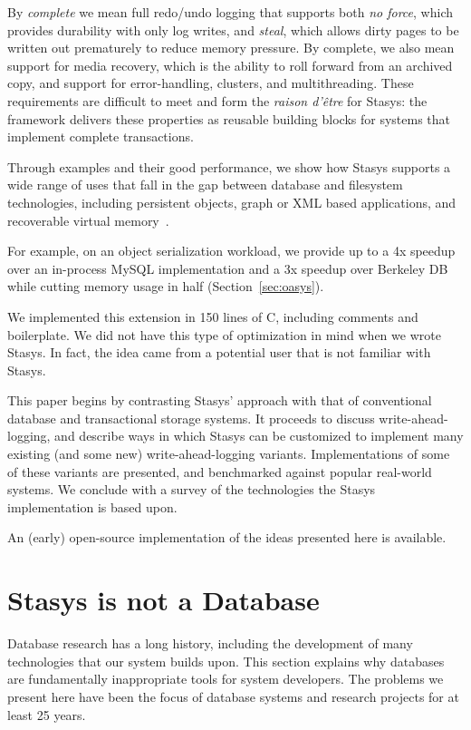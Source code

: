 \documentclass[letterpaper,twocolumn,10pt]{article}
\newcommand{\yad}{Stasys\xspace}
\newcommand{\yads}{Stasys'\xspace}
\begin{document}
By {\em complete} we mean full redo/undo logging that supports
both {\em no force}, which provides durability with only log writes,
and {\em steal}, which allows dirty pages to be written out prematurely
to reduce memory pressure. By complete, we also
mean support for media recovery, which is the ability to roll
forward from an archived copy, and support for error-handling,
clusters, and multithreading. These requirements are difficult
to meet and form the {\em raison d'\^etre} for \yad{}: the framework
delivers these properties as reusable building blocks for systems
that implement complete transactions.

Through examples and their good performance, we show how \yad{}
supports a wide range of uses that fall in the gap between 
database and filesystem technologies, including
persistent objects, graph or XML based applications, and recoverable
virtual memory~\cite{lrvm}.  

For example, on an object serialization workload, we provide up to 
a 4x speedup over an in-process 
MySQL implementation and a 3x speedup over Berkeley DB while 
cutting memory usage in half (Section~\ref{sec:oasys}). 

We implemented this extension in 150 lines of C, including comments and boilerplate.  We did not have this type of optimization
in mind when we wrote \yad.  In fact, the idea came from a potential 
user that is not familiar with \yad.


This paper begins by contrasting \yads approach with that of
conventional database and transactional storage systems.  It proceeds
to discuss write-ahead-logging, and describe ways in which \yad can be
customized to implement many existing (and some new) write-ahead-logging variants.  Implementations of some of these variants are
presented, and benchmarked against popular real-world systems.  We
conclude with a survey of the technologies the \yad implementation is
based upon.

An (early) open-source implementation of
the ideas presented here is available.

\section{\yad is not a Database}
\label{sec:notDB}
Database research has a long history, including the development of
many technologies that our system builds upon.  This section explains
why databases are fundamentally inappropriate tools for system
developers.  The problems we present here have been the focus of
database systems and research projects for at least 25 years.
\end{document}
